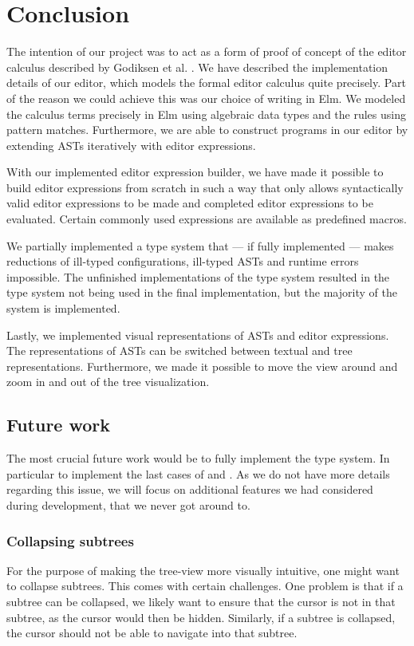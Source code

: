 \section{Conclusion}
\label{conclusion}

The intention of our project was to act as a form of proof of concept of the
editor calculus described by Godiksen et al. \pepm. We have described the
implementation details of our editor, which models the formal editor calculus
quite precisely. Part of the reason we could achieve this was our choice of
writing in Elm. We modeled the calculus terms precisely in Elm using algebraic
data types and the rules using pattern matches. Furthermore, we are able to
construct programs in our editor by extending ASTs iteratively with editor
expressions.

With our implemented editor expression builder, we have made it possible to
build editor expressions from scratch in such a way that only allows
syntactically valid editor expressions to be made and completed editor
expressions to be evaluated. Certain commonly used expressions are available as
predefined macros.

We partially implemented a type system that --- if fully implemented --- makes
reductions of ill-typed configurations, ill-typed ASTs and runtime errors
impossible. The unfinished implementations of the type system resulted in the
type system not being used in the final implementation, but the majority of the
system is implemented.

Lastly, we implemented visual representations of ASTs and editor expressions.
The representations of ASTs can be switched between textual and tree
representations. Furthermore, we made it possible to move the view around and
zoom in and out of the tree visualization.

\subsection{Future work}

The most crucial future work would be to fully implement the type system. In
particular to implement the last cases of  and .
As we do not have more details regarding this issue, we will focus on additional
features we had considered during development, that we never got around to.

\subsubsection{Collapsing subtrees}
For the purpose of making the tree-view more visually intuitive, one might want
to collapse subtrees. This comes with certain challenges. One problem is that if
a subtree can be collapsed, we likely want to ensure that the cursor is not in
that subtree, as the cursor would then be hidden. Similarly, if a subtree is
collapsed, the cursor should not be able to navigate into that subtree.


